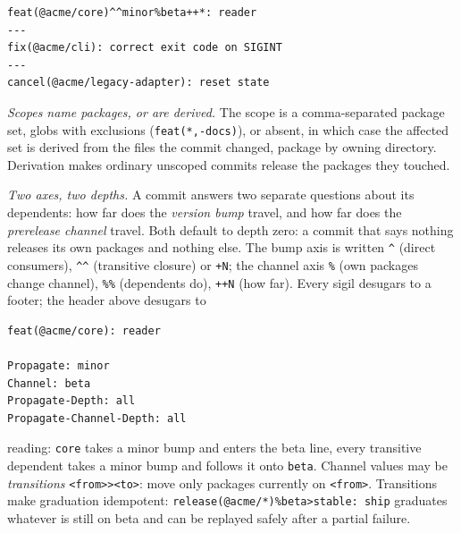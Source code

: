\documentclass[10pt,conference]{IEEEtran}
\theoremstyle{definition}
\newcommand{\code}[1]{\texttt{#1}}
\begin{document}
\begin{small}
\begin{verbatim}
feat(@acme/core)^^minor%beta++*: reader
---
fix(@acme/cli): correct exit code on SIGINT
---
cancel(@acme/legacy-adapter): reset state
\end{verbatim}
\end{small}

\emph{Scopes name packages, or are derived.} The scope is a
comma-separated package set, globs with exclusions
(\code{feat(*,-docs)}), or absent, in which case the affected set is
derived from the files the commit changed, package by owning directory.
Derivation makes ordinary unscoped commits release the packages they touched.

\emph{Two axes, two depths.} A commit answers two separate questions
about its dependents: how far does the \emph{version bump} travel, and
how far does the \emph{prerelease channel} travel. Both default to depth
zero: a commit that says nothing releases its own packages and nothing
else. The bump axis is written \code{\^{}} (direct consumers),
\code{\^{}\^{}} (transitive closure) or \code{+N}; the channel axis
\code{\%} (own packages change channel), \code{\%\%} (dependents do),
\code{++N} (how far). Every sigil desugars to a footer; the header above
desugars to
\begin{small}
\begin{verbatim}
feat(@acme/core): reader

Propagate: minor
Channel: beta
Propagate-Depth: all
Propagate-Channel-Depth: all
\end{verbatim}
\end{small}
reading: \code{core} takes a minor bump and enters the beta line, every
transitive dependent takes a minor bump and follows it onto \code{beta}.
Channel values may be \emph{transitions} \code{<from>><to>}: move only
packages currently on \code{<from>}. Transitions make graduation
idempotent: \code{release(@acme/*)\%beta>stable:~ship} graduates
whatever is still on beta and can be replayed safely after a partial
failure.
\end{document}
